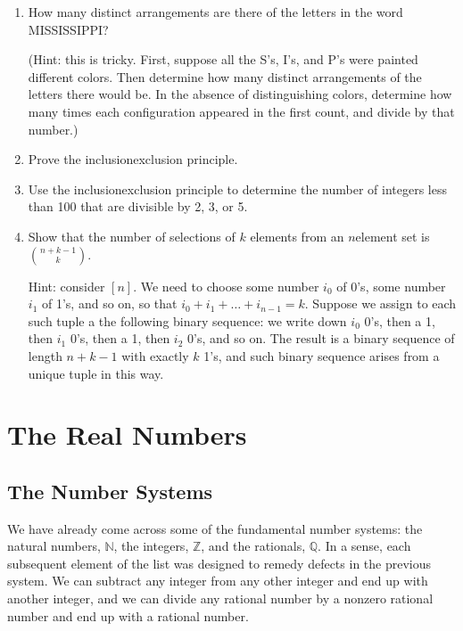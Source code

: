 \documentclass[letterpaper,10pt,english]{sphinxmanual}
\begin{document}
\begin{enumerate}
\item {} 
\sphinxAtStartPar
How many distinct arrangements are there of the letters in the word MISSISSIPPI?

\sphinxAtStartPar
(Hint: this is tricky. First, suppose all the S’s, I’s, and P’s were painted different colors. Then determine how many distinct arrangements of the letters there would be. In the absence of distinguishing colors, determine how many times each configuration appeared in the first count, and divide by that number.)

\item {} 
\sphinxAtStartPar
Prove the inclusion\sphinxhyphen{}exclusion principle.

\item {} 
\sphinxAtStartPar
Use the inclusion\sphinxhyphen{}exclusion principle to determine the number of integers less than 100 that are divisible by 2, 3, or 5.

\item {} 
\sphinxAtStartPar
Show that the number of  selections of \(k\) elements from an \(n\)\sphinxhyphen{}element set is \(\binom{n + k - 1}{k}\).

\sphinxAtStartPar
Hint: consider \([n]\). We need to choose some number \(i_0\) of 0’s, some number \(i_1\) of 1’s, and so on, so that \(i_0 + i_1 + \ldots + i_{n-1} = k\). Suppose we assign to each such tuple a the following binary sequence: we write down \(i_0\) 0’s, then a 1, then \(i_1\) 0’s, then a 1, then \(i_2\) 0’s, and so on. The result is a binary sequence of length \(n + k - 1\) with exactly \(k\) 1’s, and such binary sequence arises from a unique tuple in this way.

\end{enumerate}


\chapter{The Real Numbers}
\label{\detokenize{the_real_numbers:the-real-numbers}}\label{\detokenize{the_real_numbers:id1}}\label{\detokenize{the_real_numbers::doc}}

\section{The Number Systems}
\label{\detokenize{the_real_numbers:the-number-systems}}
\sphinxAtStartPar
We have already come across some of the fundamental number systems: the natural numbers, \(\mathbb{N}\), the integers, \(\mathbb{Z}\), and the rationals, \(\mathbb{Q}\). In a sense, each subsequent element of the list was designed to remedy defects in the previous system. We can subtract any integer from any other integer and end up with another integer, and we can divide any rational number by a nonzero rational number and end up with a rational number.
\end{document}
